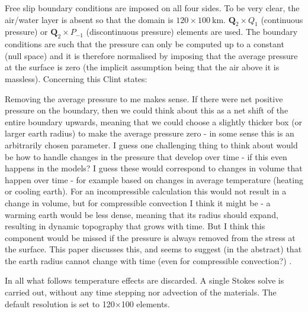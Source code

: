 Free slip boundary conditions are imposed on all four sides.
To be very clear, the air/water layer is absent so that the domain is $120\times100~\si{\km}$.
 ${\bm Q}_2 \times Q_1$ (continuous pressure)
or ${\bm Q}_2\times P_{-1}$ (discontinuous pressure) elements are used.
The boundary conditions are such that the pressure can only be computed up to a constant (null space)
and it is therefore normalised by imposing that the average pressure at the surface is zero 
(the implicit assumption being that the air above it is massless).
Concerning this Clint states:
\begin{displayquote}
{\color{darkgray}
Removing the average pressure to me makes sense. If there were net positive pressure on the boundary, 
then we could think about this as a net shift of the entire boundary upwards, meaning that we could 
choose a slightly thicker box (or larger earth radius) to make the average pressure zero - in 
some sense this is an arbitrarily chosen parameter. I guess one challenging thing to think about would 
be how to handle changes in the pressure that develop over time - if this even happens in the models? 
I guess these would correspond to changes in volume that happen over time - for example based on changes 
in average temperature (heating or cooling earth). For an incompressible calculation this would not result 
in a change in volume, but for compressible convection I think it might be - a warming earth would be less 
dense, meaning that its radius should expand, resulting in dynamic topography that grows with time. But I 
think this component would be missed if the pressure is always removed from the stress at the surface. 
This paper discusses this, and seems to suggest (in the abstract) that the earth radius cannot change with 
time (even for compressible convection?) \cite{foro22}.
}
\end{displayquote}



In all what follows temperature effects are discarded. A single Stokes solve is carried out, without any 
time stepping nor advection of the materials.
The default resolution is set to 120$\times$100 elements.

